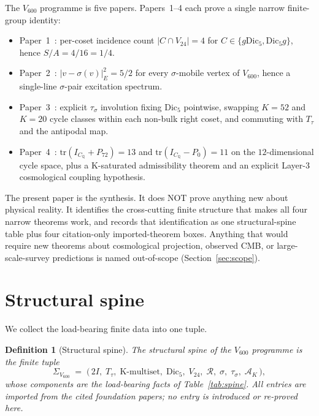 \documentclass[11pt]{article}
\newtheorem{definition}{Definition}[section]
\theoremstyle{remark}
\newcommand{\twoI}{2I}
\newcommand{\Vsixhundred}{V_{600}}
\newcommand{\Dicfive}{\mathrm{Dic}_5}
\newcommand{\Vtwentyfour}{V_{24}}
\newcommand{\Sigmaspine}{\Sigma_{\Vsixhundred}}
\newcommand{\CQ}{C_{\mathbb{Q}}}
\newcommand{\Ttau}{T_{\tau}}
\newcommand{\sigmaG}{\sigma}
\newcommand{\tausigma}{\tau_\sigma}
\newcommand{\AK}{\mathcal{A}_K}
\newcommand{\PK}[1]{P_{#1}}
\begin{document}
The $\Vsixhundred$ programme is five papers. Papers~1--4 each prove
a single narrow finite-group identity:
\begin{itemize}[leftmargin=2em]
  \item Paper~1~\citep{V600Paper1}: per-coset incidence count
  $|C \cap \Vtwentyfour| = 4$ for $C \in \{g\Dicfive, \Dicfive g\}$,
  hence $S/A = 4/16 = 1/4$.
  \item Paper~2~\citep{V600Paper2}: $|v - \sigmaG(v)|_E^2 = 5/2$ for
  every $\sigmaG$-mobile vertex of $\Vsixhundred$, hence a single-line
  $\sigmaG$-pair excitation spectrum.
  \item Paper~3~\citep{V600Paper3}: explicit $\tausigma$ involution
  fixing $\Dicfive$ pointwise, swapping $K = 52$ and $K = 20$ cycle
  classes within each non-bulk right coset, and commuting with
  $\Ttau$ and the antipodal map.
  \item Paper~4~\citep{V600Paper4}: $\mathrm{tr}(I_{\CQ} + \PK{72}) = 13$
  and $\mathrm{tr}(I_{\CQ} - \PK{0}) = 11$ on the $12$-dimensional
  cycle space, plus a K-saturated admissibility theorem and an
  explicit Layer-3 cosmological coupling hypothesis.
\end{itemize}

The present paper is the synthesis. It does NOT prove anything new
about physical reality. It identifies the cross-cutting finite
structure that makes all four narrow theorems work, and records that
identification as one structural-spine table plus four citation-only
imported-theorem boxes. Anything that would require new theorems
about cosmological projection, observed CMB, or large-scale-survey
predictions is named out-of-scope (Section~\ref{sec:scope}).

\section{Structural spine}\label{sec:spine}

We collect the load-bearing finite data into one tuple.

\begin{definition}[Structural spine]\label{def:spine}
The \emph{structural spine} of the $\Vsixhundred$ programme is the
finite tuple
\[
  \Sigmaspine \;=\; \bigl(\,
    \twoI,\;
    \Ttau,\;
    \mathrm{K\text{-multiset}},\;
    \Dicfive,\;
    \Vtwentyfour,\;
    \mathcal{R},\;
    \sigmaG,\;
    \tausigma,\;
    \AK\,
  \bigr),
\]
whose components are the load-bearing facts of
Table~\ref{tab:spine}. All entries are imported from the cited
foundation papers; no entry is introduced or re-proved here.
\end{definition}
\end{document}
